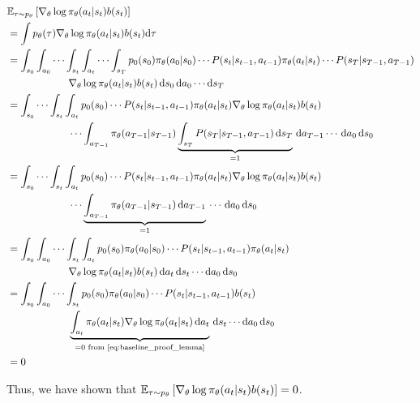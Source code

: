 \documentclass{article}
\begin{document}
\begin{tcolorbox}[breakable,enhanced,colback=gray!10!white,colframe=gray!50!black,
title={$\BBE_{\tau \sim p_\theta} \left[\nabla_\theta \log \pi_\theta(a_t \vert s_t) b(s_t)\right] = 0$}]
\begin{align*}
&\BBE_{\tau \sim p_\theta} \left[\nabla_\theta \log \pi_\theta(a_t \vert s_t) b(s_t)\right] \\
%
&= \int p_\theta(\tau) \nabla_\theta \log \pi_\theta(a_t \vert s_t) b(s_t) \dtau \\
%
&= \int_{s_0} \int_{a_0} \cdots \int_{s_t} \int_{a_t} \cdots \int_{s_T} p_0(s_0) \pi_\theta(a_0 \vert s_0) \cdots P(s_t \vert s_{t-1}, a_{t-1}) \pi_\theta(a_t \vert s_t) \cdots P(s_T \vert s_{T-1}, a_{T-1}) \\
&\qquad \qquad \qquad \nabla_\theta \log \pi_\theta(a_t \vert s_t) b(s_t) \, \ds_0 \, \da_0 \cdots \ds_T \\
%
&= \int_{s_0} \cdots \int_{s_t} \int_{a_t} p_0(s_0) \cdots P(s_t \vert s_{t-1}, a_{t-1}) \pi_\theta(a_t \vert s_t) \nabla_\theta \log \pi_\theta(a_t \vert s_t) b(s_t) \\
&\qquad \qquad \qquad \cdots \int_{a_{T-1}} \pi_\theta(a_{T-1} \vert s_{T-1}) \underbrace{\int_{s_T} P(s_T \vert s_{T-1}, a_{T-1})\,\ds_T}_{=1} \, \da_{T-1} \cdots \, \da_0 \, \ds_0 \\
% 
&= \int_{s_0} \cdots \int_{s_t} \int_{a_t} p_0(s_0) \cdots P(s_t \vert s_{t-1}, a_{t-1}) \pi_\theta(a_t \vert s_t) \nabla_\theta \log \pi_\theta(a_t \vert s_t) b(s_t) \\
&\qquad \qquad \qquad \cdots  \underbrace{\int_{a_{T-1}} \pi_\theta(a_{T-1} \vert s_{T-1}) \, \da_{T-1}}_{=1} \,  \cdots \, \da_0 \, \ds_0 \\
% 
&= \int_{s_0} \int_{a_0} \cdots \int_{s_t} \int_{a_t} p_0(s_0) \pi_\theta(a_0 \vert s_0) \cdots P(s_t \vert s_{t-1}, a_{t-1}) \pi_\theta(a_t \vert s_t) \\
&\qquad \qquad \qquad \nabla_\theta \log \pi_\theta(a_t \vert s_t) b(s_t) \, \da_t \, \ds_t \cdots \da_0 \, \ds_0 \\
% 
&= \int_{s_0} \int_{a_0} \cdots \int_{s_t} p_0(s_0) \pi_\theta(a_0 \vert s_0) \cdots P(s_t \vert s_{t-1}, a_{t-1}) b(s_t) \\
&\qquad \qquad \qquad \underbrace{\int_{a_t} \pi_\theta(a_t \vert s_t) \nabla_\theta \log \pi_\theta(a_t \vert s_t) \, \da_t}_{=0 \text{ from~\eqref{eq:baseline_proof_lemma}}} \, \ds_t \cdots \da_0 \, \ds_0 \\
&=0
\end{align*}
\end{tcolorbox}
Thus, we have shown that \(\BBE_{\tau \sim p_\theta} \left[\nabla_\theta \log \pi_\theta(a_t \vert s_t) b(s_t)\right] = 0 \).
\end{document}
